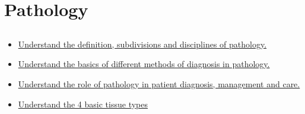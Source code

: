 \documentclass[10pt, a4paper]{article}
\newcommand{\MYhref}[3][blue]{\href{#2}{\color{#1}{#3}}}%
\begin{document}
\section{Pathology}
\subsection{\MYhref[melbBlue]{https://notion.so/3688a9d7b8444c0a95937af7fa92cf3f}{Introduction to Histology and Pathology}} \begin{itemize} \item \href{https://www.notion.so/dbfe3bf76d0f4a988b6d6625d5c5b454}{Understand the definition, subdivisions and disciplines of pathology.} \item \href{https://www.notion.so/fd49d59fa4d14509b8192a2ae4955478}{Understand the basics of different methods of diagnosis in pathology.} \item \href{https://www.notion.so/588064dafd9d4b6b9c795495a9b113d2}{Understand the role of pathology in patient diagnosis, management and care.} \item \href{https://www.notion.so/a60c15863b704d91a4d38cebca253b86}{Understand the 4 basic tissue types} \end{itemize}
\end{document}
